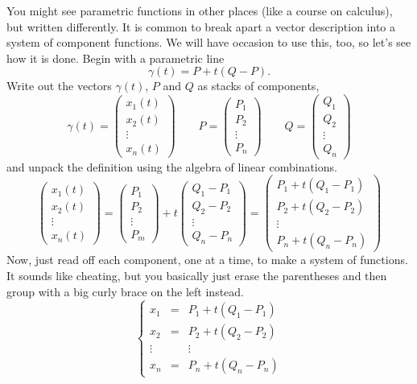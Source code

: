 \documentclass[elementsmain.tex]{subfiles}
\begin{document}
You might see parametric functions in other places (like a course on calculus),
but written differently. It is common to break apart a vector description into a system of component functions. We will have occasion to use this, too, so let's see how it is done. Begin with a parametric line 
\[
\gamma(t) = P + t (Q-P).
\] 
Write out the vectors $\gamma(t)$, $P$ and $Q$ as stacks of components, 
\[
\gamma(t) = \begin{pmatrix} x_1(t) \\ x_2(t) \\ \vdots \\ x_n(t) \end{pmatrix}
\qquad
P = \begin{pmatrix} P_1 \\ P_2 \\ \vdots \\ P_n \end{pmatrix}
\qquad
Q = \begin{pmatrix} Q_1 \\ Q_2 \\ \vdots \\ Q_n \end{pmatrix}
\]
and unpack the definition using the algebra of linear combinations.
\[
\begin{pmatrix} x_1(t) \\ x_2(t) \\ \vdots \\ x_n(t) \end{pmatrix}
= \begin{pmatrix} P_1 \\ P_2 \\ \vdots \\ P_m \end{pmatrix} 
+ t \begin{pmatrix} Q_1-P_1 \\ Q_2-P_2 \\ \vdots \\ Q_n-P_n \end{pmatrix}
= \begin{pmatrix} P_1 + t (Q_1-P_1) \\ P_2 + t (Q_2-P_2) \\ \vdots \\ P_n + t (Q_n-P_n) \end{pmatrix}
\]
Now, just read off each component, one at a time, to make a system of functions. It sounds like cheating, but you basically just erase the parentheses and then group with a big curly brace on the left instead.
\begin{equation*}
\left\{\begin{array}{ccc}
x_1 & = & P_1 + t(Q_1 - P_1) \\
x_2 & = & P_2 + t(Q_2 - P_2) \\
\vdots & & \vdots \\
x_n & = & P_n + t(Q_n - P_n)
\end{array}\right.
\end{equation*}
\end{document}

